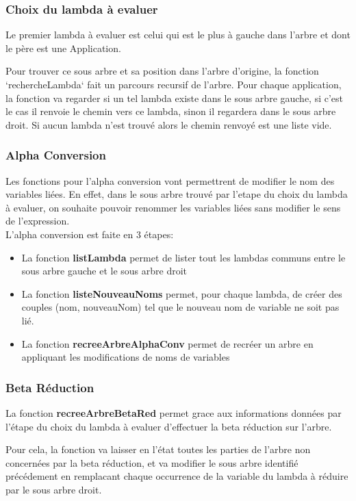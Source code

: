 \documentclass[a4paper,11pt,titlepage]{article}
\begin{document}
\subsubsection{Choix du lambda à evaluer}

Le premier lambda à evaluer est celui qui est le plus à gauche dans l'arbre et dont le père est une Application.

Pour trouver ce sous arbre et sa position dans l'arbre d'origine, la fonction `rechercheLambda` fait un parcours recursif de l'arbre.
Pour chaque application, la fonction va regarder si un tel lambda existe dans le sous arbre gauche, si c'est le cas il renvoie le chemin vers ce lambda,
 sinon il regardera dans le sous arbre droit. Si aucun lambda n'est trouvé alors le chemin renvoyé est une liste vide.

\subsubsection{Alpha Conversion}


Les fonctions pour l'alpha conversion vont permettrent de modifier le nom des variables liées. En effet, dans le sous arbre trouvé par 
l'etape du choix du lambda à evaluer, on souhaite pouvoir renommer les variables liées sans modifier le sens de l'expression.\\

L'alpha conversion est faite en 3 étapes:
\begin{itemize}
 \item La fonction \textbf{listLambda} permet de lister tout les lambdas communs entre le sous arbre gauche et le sous arbre droit
 \item La fonction \textbf{listeNouveauNoms} permet, pour chaque lambda, de créer des couples (nom, nouveauNom) tel que le nouveau
nom de variable ne soit pas lié.
 \item La fonction \textbf{recreeArbreAlphaConv} permet de recréer un arbre en appliquant les modifications de noms de variables
\end{itemize}


\subsubsection{Beta Réduction}

  La fonction \textbf{recreeArbreBetaRed} permet grace aux informations données par l'étape du choix du lambda à evaluer d'effectuer la
beta réduction sur l'arbre.

  Pour cela, la fonction va laisser en l'état toutes les parties de l'arbre non concernées par la beta réduction, et va modifier
le sous arbre identifié précédement en remplacant chaque occurrence de la variable du lambda à réduire par le sous arbre
droit.
\end{document}
